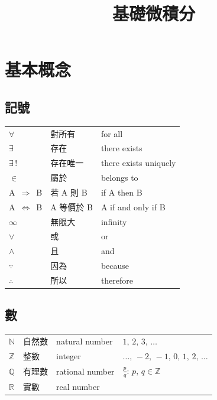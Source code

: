 \documentclass[12pt,a4paper]{extarticle}
\newcommand{\ds}{\displaystyle}
\theoremstyle{definition}
\begin{document}
\title{\texorpdfstring{\vspace{-16mm} 基礎微積分}{基礎微積分}} 
\author{\vspace{-5em}}
\date{\vspace{-5em}}
\maketitle
\thispagestyle{firststyle}

\section*{基本概念}
\subsection*{記號}

\vspace{-5mm}
\begin{table}[!htbp]
  \centering
  \begin{tabular}{lll}
    \toprule
    $\forall$ & 對所有 & for all \\
    $\exists$ & 存在   & there exists \\
    $\exists\,!$ & 存在唯一 & there exists uniquely \\
    $\in$ & 屬於 & belongs to \\
    A $\,\Longrightarrow\,$ B &  若 A 則 B & if A then B \\
    A $\,\Longleftrightarrow\,$ B &  A 等價於 B & A if and only if B \\
    $\infty$ & 無限大 & infinity \\
    $\vee$ & 或 & or \\
    $\wedge$ & 且 & and \\
    $\because$ & 因為 & because \\
    $\therefore$ & 所以 & therefore \\
    \bottomrule
  \end{tabular}
\end{table}

\vspace{-5mm}
\subsection*{數}

\vspace{-5mm}
\begin{table}[!htbp]
  \centering
  \begin{tabular}{llll}
    \toprule
    $\mathbb{N}$ & 自然數 & natural number & $1,\,2,\,3,\,\ldots$ \\
    $\mathbb{Z}$ & 整數   & integer & $\ldots,\,-2,\,-1,\,0,\,1,\,2,\,\ldots$\\
    $\mathbb{Q}$ & 有理數 & rational number & $\ds\frac{p}{q}: \,p,\,q\in\mathbb{Z}$ \\
    $\mathbb{R}$ & 實數 & real number &  \\
    \bottomrule
  \end{tabular}
\end{table}
\end{document}
